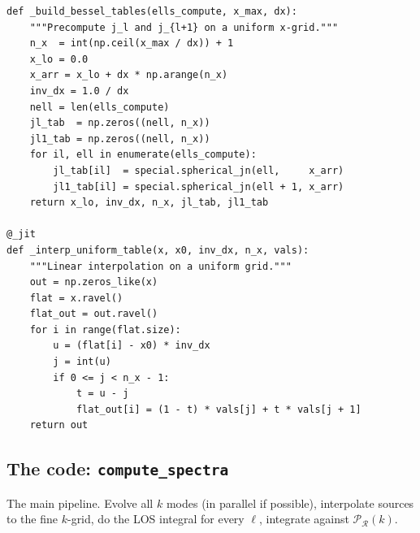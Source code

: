 \begin{codebox}
\begin{lstlisting}[style=python]
def _build_bessel_tables(ells_compute, x_max, dx):
    """Precompute j_l and j_{l+1} on a uniform x-grid."""
    n_x  = int(np.ceil(x_max / dx)) + 1
    x_lo = 0.0
    x_arr = x_lo + dx * np.arange(n_x)
    inv_dx = 1.0 / dx
    nell = len(ells_compute)
    jl_tab  = np.zeros((nell, n_x))
    jl1_tab = np.zeros((nell, n_x))
    for il, ell in enumerate(ells_compute):
        jl_tab[il]  = special.spherical_jn(ell,     x_arr)
        jl1_tab[il] = special.spherical_jn(ell + 1, x_arr)
    return x_lo, inv_dx, n_x, jl_tab, jl1_tab

@_jit
def _interp_uniform_table(x, x0, inv_dx, n_x, vals):
    """Linear interpolation on a uniform grid."""
    out = np.zeros_like(x)
    flat = x.ravel()
    flat_out = out.ravel()
    for i in range(flat.size):
        u = (flat[i] - x0) * inv_dx
        j = int(u)
        if 0 <= j < n_x - 1:
            t = u - j
            flat_out[i] = (1 - t) * vals[j] + t * vals[j + 1]
    return out
\end{lstlisting}
\end{codebox}

\subsection{The code: \texttt{compute\_spectra}}

The main pipeline. Evolve all $k$ modes (in parallel if possible), interpolate sources to the fine $k$-grid, do the LOS integral for every $\ell$, integrate against $\mathcal{P}_\mathcal{R}(k)$.

